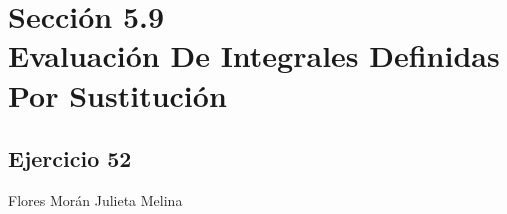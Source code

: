 \documentclass[12pt]{article}
\begin{document}
\section{Sección 5.9 \\ Evaluación De Integrales Definidas Por Sustitución}
\subsection{Ejercicio 52} Flores Morán Julieta Melina \\
\end{document}
